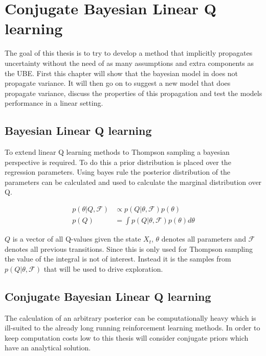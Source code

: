 \chapter{Conjugate Bayesian Linear Q learning}{\label{ch:linear}}

The goal of this thesis is to try to develop a method that implicitly propagates uncertainty without the need of as many assumptions and extra components as the UBE. First this chapter will show that the bayesian model in \cite{azziz_2018} does not propagate variance. It will then go on to suggest a new model that does propagate variance, discuss the properties of this propagation and test the models performance in a linear setting. 

\section{Bayesian Linear Q learning}

To extend linear Q learning methods to Thompson sampling a bayesian perspective is required. To do this a prior distribution is placed over the regression parameters. Using bayes rule the posterior distribution of the parameters can be calculated and used to calculate the marginal distribution over Q.

\begin{align*}
    p(\theta |Q, \mathcal{F}) &\propto p(Q| \theta, \mathcal{F})p(\theta) \\
    p(Q) &= \int p(Q|\theta, \mathcal{F}) p(\theta) d\theta
\end{align*}

$Q$ is a vector of all Q-values given the state $X_t$, $\theta$ denotes all parameters and $\mathcal{F}$ denotes all previous transitions. Since this is only used for Thompson sampling the value of the integral is not of interest. Instead it is the samples from $p(Q|\theta, \mathcal{F})$ that will be used to drive exploration.

\section{Conjugate Bayesian Linear Q learning}

The calculation of an arbitrary posterior can be computationally heavy which is ill-suited to the already long running reinforcement learning methods. In order to keep computation costs low to this thesis will consider conjugate priors which have an analytical solution.

